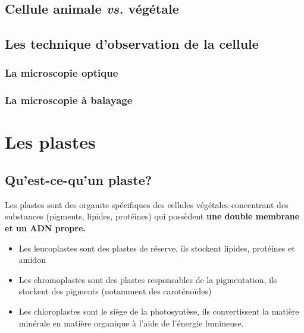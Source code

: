 \documentclass[
]{book}
\providecommand{\tightlist}{%
  \setlength{\itemsep}{0pt}\setlength{\parskip}{0pt}}
\begin{document}
\hypertarget{cellule-animale-vs.-vuxe9guxe9tale}{%
\subsection{\texorpdfstring{Cellule animale \emph{vs.} végétale}{Cellule animale vs. végétale}}\label{cellule-animale-vs.-vuxe9guxe9tale}}

\hypertarget{les-technique-dobservation-de-la-cellule}{%
\subsection{Les technique d'observation de la cellule}\label{les-technique-dobservation-de-la-cellule}}

\hypertarget{la-microscopie-optique}{%
\subsubsection{La microscopie optique}\label{la-microscopie-optique}}

\hypertarget{la-microscopie-uxe0-balayage}{%
\subsubsection{La microscopie à balayage}\label{la-microscopie-uxe0-balayage}}

\hypertarget{les-plastes}{%
\section{Les plastes}\label{les-plastes}}

\hypertarget{quest-ce-quun-plaste}{%
\subsection{Qu'est-ce-qu'un plaste?}\label{quest-ce-quun-plaste}}

Les plastes sont des organite spécifiques des cellules végétales concentrant des substances (pigments, lipides, protéines) qui possèdent \textbf{une double membrane et un ADN propre.}

\begin{itemize}
\tightlist
\item
  Les leucoplastes sont des plastes de réserve, ils stockent lipides, protéines et amidon
\item
  Les chromoplastes sont des plastes responsables de la pigmentation, ils stockent des pigments (notamment des caroténoïdes)
\item
  Les chloroplastes sont le siège de la photosyntèse, ils convertissent la matière minérale en matière organique à l'aide de l'énergie lumineuse.
\end{itemize}
\end{document}
